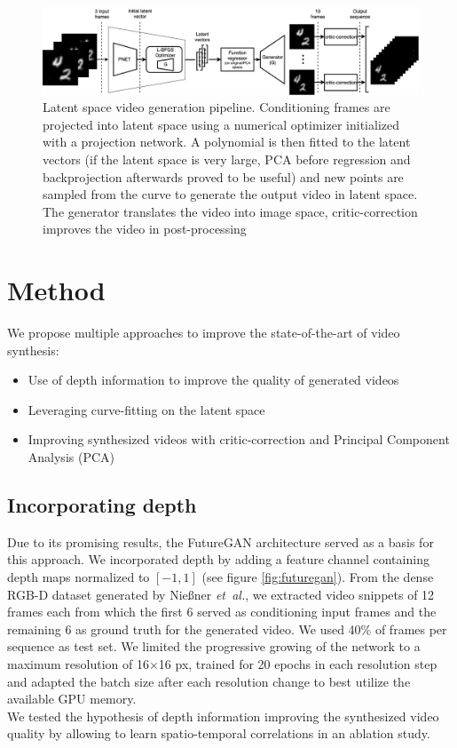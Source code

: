 \documentclass[10pt,twocolumn,letterpaper]{article}
\begin{document}
\begin{figure}[]
	\centering
	\includegraphics[width=\textwidth]{graphics/LSVG/LSVG.png}
	\caption{Latent space video generation pipeline. Conditioning frames are projected into latent space using a numerical optimizer initialized with a projection network. A polynomial is then fitted to the latent vectors (if the latent space is very large, PCA before regression and backprojection afterwards proved to be useful) and new points are sampled from the curve to generate the output video in latent space. The generator translates the video into image space, critic-correction improves the video in post-processing}
	\label{fig:lsvg}
\end{figure}
\section{Method}
We propose multiple approaches to improve the state-of-the-art of video synthesis:
\begin{itemize}[noitemsep]
	\renewcommand{\labelitemi}{\tiny$\blacksquare$}
	\item Use of depth information to improve the quality of generated videos
	\item Leveraging curve-fitting on the latent space
	\item Improving synthesized videos with critic-correction and Principal Component Analysis (PCA)
\end{itemize} 
\subsection{Incorporating depth}
Due to its promising results, the FutureGAN architecture \cite{Aigner2019} served as a basis for this approach. We incorporated depth by adding a feature channel containing depth maps normalized to $[-1,1]$ (see figure \ref{fig:futuregan}). From the dense RGB-D dataset generated by Nie\ss ner {\em et\ al.}, we extracted video snippets of 12 frames each from which the first 6 served as conditioning input frames and the remaining 6 as ground truth for the generated video. We used 40\% of frames per sequence as test set. We limited the progressive growing of the network to a maximum resolution of 16$\times$16 px, trained for 20 epochs in each resolution step and adapted the batch size after each resolution change to best utilize the available GPU memory. \\
We tested the hypothesis of depth information improving the synthesized video quality by allowing to learn spatio-temporal correlations in an ablation study.
\end{document}
